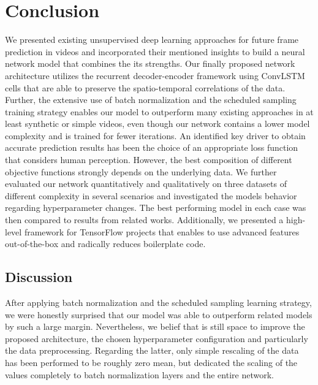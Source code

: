 
\chapter{Conclusion} \label{chapter:conclusion}

We presented existing unsupervised deep learning approaches for future frame prediction in videos and incorporated their mentioned insights to build a neural network model that combines the its strengths. Our finally proposed network architecture utilizes the recurrent decoder-encoder framework using ConvLSTM cells that are able to preserve the spatio-temporal correlations of the data. Further, the extensive use of batch normalization and the scheduled sampling training strategy enables our model to outperform many existing approaches in at least synthetic or simple videos, even though our network contains a lower model complexity and is trained for fewer iterations. An identified key driver to obtain accurate prediction results has been the choice of an appropriate loss function that considers human perception. However, the best composition of different objective functions strongly depends on the underlying data. We further evaluated our network quantitatively and qualitatively on three datasets of different complexity in several scenarios and investigated the models behavior regarding hyperparameter changes. The best performing model in each case was then compared to results from related works. Additionally, we presented a high-level framework for TensorFlow projects that enables to use advanced features out-of-the-box and radically reduces boilerplate code.

\section{Discussion}

After applying batch normalization and the scheduled sampling learning strategy, we were honestly surprised that our model was able to outperform related models by such a large margin. Nevertheless, we belief that is still space to improve the proposed architecture, the chosen hyperparameter configuration and particularly the data preprocessing. Regarding the latter, only simple rescaling of the data has been performed to be roughly zero mean, but dedicated the scaling of the values completely to batch normalization layers and the entire network.

